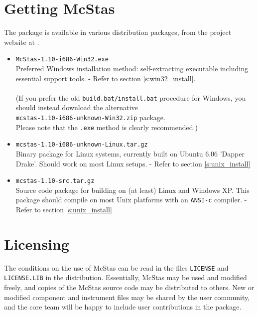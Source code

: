 \label{s:install}

\section{Getting McStas}
\label{s:obtain}
The  package is
available in various distribution packages, from the project
website at
.
\begin{itemize}
\item{\texttt{McStas-1.10-i686-Win32.exe}\\Preferred Windows
    installation method: self-extracting executable
    including essential support tools. - Refer to section
    \ref{s:win32_install}. \\\ \\(If you prefer the old \verb+build.bat/install.bat+
    procedure for Windows, you should instead download the alternative
    \\\texttt{mcstas-1.10-i686-unknown-Win32.zip} package. \\Please note that
    the \verb+.exe+ method is clearly recommended.)}
\item{\texttt{mcstas-1.10-i686-unknown-Linux.tar.gz}\\Binary package
  for Linux systems, currently built on Ubuntu 6.06 'Dapper Drake'.
  Should work on most Linux setups.
 - Refer to section \ref{s:unix_install}}
\item{\texttt{mcstas-1.10-src.tar.gz}\\Source code package for
    building  on
    (at least) Linux and Windows XP. This package should compile on
    most Unix platforms with an \texttt{ANSI-c} compiler. - Refer to section \ref{s:unix_install}}
\end{itemize}

\section{Licensing}
The conditions on the use of McStas can be read in the files
\verb+LICENSE+ and \verb+LICENSE.LIB+ in the distribution. Essentially,
McStas may be used and modified freely, and copies of the McStas source code
may be distributed to others.
New or modified component and instrument files may be shared by
the user community, and the core team will be happy to include user contributions in the package.

